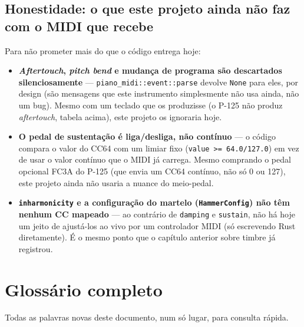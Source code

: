 \documentclass[11pt,oneside]{book}
\begin{document}
\section*{Honestidade: o que este projeto ainda não faz com o MIDI que
recebe}

Para não prometer mais do que o código entrega hoje:

\begin{itemize}
\item \textbf{\emph{Aftertouch}, \emph{pitch bend} e mudança de programa
são descartados silenciosamente} --- \texttt{piano\_midi::event::parse}
devolve \texttt{None} para eles, por design (são mensagens que este
instrumento simplesmente não usa ainda, não um bug). Mesmo com um teclado
que os produzisse (o P-125 não produz \emph{aftertouch}, tabela acima),
este projeto os ignoraria hoje.
\item \textbf{O pedal de sustentação é liga/desliga, não contínuo} --- o
código compara o valor do CC64 com um limiar fixo
(\texttt{value >= 64.0/127.0}) em vez de usar o valor contínuo que o MIDI
já carrega. Mesmo comprando o pedal opcional FC3A do P-125 (que envia um
CC64 contínuo, não só 0 ou 127), este projeto ainda não usaria a nuance do
meio-pedal.
\item \textbf{\texttt{inharmonicity} e a configuração do martelo
(\texttt{HammerConfig}) não têm nenhum CC mapeado} --- ao contrário de
\texttt{damping} e \texttt{sustain}, não há hoje um jeito de ajustá-los ao
vivo por um controlador MIDI (só escrevendo Rust diretamente). É o mesmo
ponto que o capítulo anterior sobre timbre já registrou.
\end{itemize}

\backmatter
\pagestyle{fancy}

\chapter*{Glossário completo}

\noindent Todas as palavras novas deste documento, num só lugar, para
consulta rápida.
\end{document}
